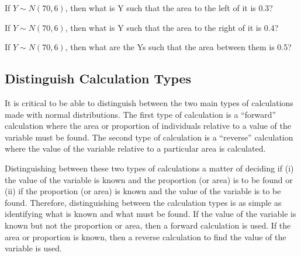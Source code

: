 \documentclass[10pt,openany]{book}\usepackage[]{graphicx}\usepackage[]{color}
\begin{document}
\begin{exsection}
  \item \label{revex:quNormXrev03} If $Y\sim N(70,6)$, then what is Y such that the area to the left of it is 0.3? 
  \item \label{revex:quNormXrev04} If $Y\sim N(70,6)$, then what is Y such that the area to the right of it is 0.4? 
  \item \label{revex:quNormXrev05} If $Y\sim N(70,6)$, then what are the Ys such that the area between them is 0.5? 
\end{exsection}


\subsection{Distinguish Calculation Types}
It is critical to be able to distinguish between the two main types of calculations made with normal distributions.  The first type of calculation is a ``forward'' calculation where the area or proportion of individuals relative to a value of the variable must be found.  The second type of calculation is a ``reverse'' calculation where the value of the variable relative to a particular area is calculated.

Distinguishing between these two types of calculations a matter of deciding if (i) the value of the variable is known and the proportion (or area) is to be found or (ii) if the proportion (or area) is known and the value of the variable is to be found.  Therefore, distinguishing between the calculation types is as simple as identifying what is known and what must be found.  If the value of the variable is known but not the proportion or area, then a forward calculation is used.  If the area or proportion is known, then a reverse calculation to find the value of the variable is used.
\end{document}
